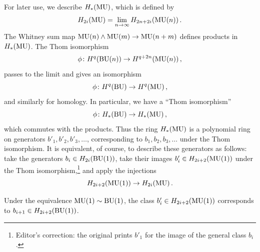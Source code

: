\documentclass[../main]{subfiles}
\begin{document}
For later use, we describe $H_{\ast}(\operatorname{MU})$, which is defined by 
\begin{equation*}
	H_{2i}(\operatorname{MU}) = \lim_{n \to \infty} H_{2n+2i}(\mathrm{MU}(n))\,.
\end{equation*} 
The Whitney sum map $\mathrm{MU}(n) \wedge \mathrm{MU}(m) \to \mathrm{MU}(n+m)$ defines products in $H_{\ast}(\operatorname{MU})$. 
The Thom isomorphism 
\begin{equation*}
	\phi\colon  H^q(\mathrm{BU}(n)) \to  H^{q+2n}(\mathrm{MU}(n))\,,
\end{equation*}
passes to the limit and gives an isomorphism
\begin{equation*}
	\phi\colon  H^q(\operatorname{BU}) \to  H^q(\operatorname{MU})\,,
\end{equation*}
and similarly for homology. 
In particular, we have a ``Thom isomorphism''
\begin{equation*}
	\phi\colon  H_{\ast}(\operatorname{BU} )  \to  H_{\ast}(\operatorname{MU} )\,, 
\end{equation*} 
which commutes with the products. 
Thus the ring $H_{\ast}(\operatorname{MU})$ is a polynomial ring on generators $b'_1,b'_2,b'_3,\ldots$, corresponding to $b_1, b_2, b_3, \ldots$ under the Thom isomorphism.
It is equivalent, of course, to describe these generators as follows: 
take the generators $b_{i} \in H_{2i}(\mathrm{BU}(1))$, take their images $b'_{i} \in H_{2i+2}(\mathrm{MU}(1))$ under the Thom isomorphism,\footnote{Editor's correction: the original prints $b'_1$ for the image of the general class $b_i$.} and apply the injections
\begin{equation*}
	H_{2i+2}(\mathrm{MU}(1)) \to H_{2i}(\operatorname{MU} )\,.
\end{equation*}

Under the equivalence $\mathrm{MU}(1) \sim \mathrm{BU}(1)$, the class $b'_{i} \in H_{2i+2}(\mathrm{MU}(1))$ corresponds to $b_{i+1} \in H_{2i+2}(\mathrm{BU}(1))$.
\end{document}
